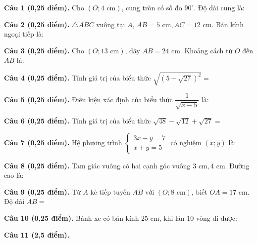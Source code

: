 \documentclass[12pt,a4paper]{article}
\begin{document}
\vspace{1.2mm}
\noindent\textbf{Câu 1 (0,25 điểm).} Cho $(O; 4\text{ cm})$, cung tròn có số đo $90^\circ$. Độ dài cung là: \par\vspace{0.8mm}
\noindent\textbf{Câu 2 (0,25 điểm).} $\triangle ABC$ vuông tại $A$, $AB = 5\text{ cm}, AC = 12\text{ cm}$. Bán kính ngoại tiếp là: \par\vspace{0.8mm}
\noindent\textbf{Câu 3 (0,25 điểm).} Cho $(O; 13\text{ cm})$, dây $AB = 24\text{ cm}$. Khoảng cách từ $O$ đến $AB$ là: \par\vspace{0.8mm}
\noindent\textbf{Câu 4 (0,25 điểm).} Tính giá trị của biểu thức $\sqrt{(5 - \sqrt{27})^2} = $ \par\vspace{0.8mm}
\noindent\textbf{Câu 5 (0,25 điểm).} Điều kiện xác định của biểu thức $\dfrac{1}{\sqrt{x - 5}}$ là: \par\vspace{0.8mm}
\noindent\textbf{Câu 6 (0,25 điểm).} Tính giá trị của biểu thức $\sqrt{48} - \sqrt{12} + \sqrt{27} = $ \par\vspace{0.8mm}
\noindent\textbf{Câu 7 (0,25 điểm).} Hệ phương trình $\begin{cases} 3x - y = 7 \\ x + y = 5 \end{cases}$ có nghiệm $(x; y)$ là: \par\vspace{0.8mm}
\noindent\textbf{Câu 8 (0,25 điểm).} Tam giác vuông có hai cạnh góc vuông $3\text{ cm}, 4\text{ cm}$. Đường cao là: \par\vspace{0.8mm}
\noindent\textbf{Câu 9 (0,25 điểm).} Từ $A$ kẻ tiếp tuyến $AB$ với $(O; 8\text{ cm})$, biết $OA = 17\text{ cm}$. Độ dài $AB = $ \par\vspace{0.8mm}
\noindent\textbf{Câu 10 (0,25 điểm).} Bánh xe có bán kính $25\text{ cm}$, khi lăn $10$ vòng đi được: \par\vspace{0.8mm}
\vspace{0.6mm}
\noindent\textbf{Câu 11 (2,5 điểm).}
\vspace{0.6mm}
\end{document}
